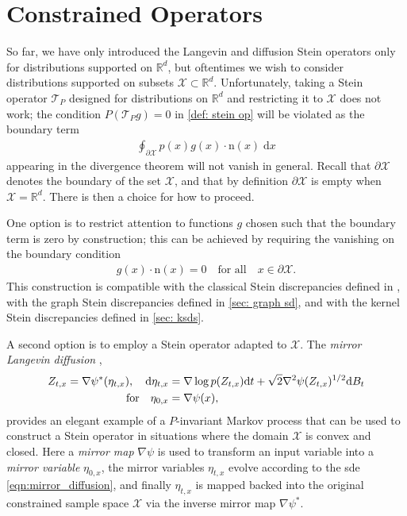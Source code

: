 \documentclass[12pt,paper=letter]{scrreprt}
\newcommand{\qtext}[1]{\quad\text{#1}\quad}
\def\reals{\mathbb{R}} %
\newcommand{\grad}{\nabla} %
\newcommand{\Hess}{\nabla^2} %
\newcommand{\xset}[0]{\mathcal{X}} %
\begin{document}
\section{Constrained Operators}
\label{sec: mirrored operators}

So far, we have only introduced the Langevin and diffusion Stein operators only for distributions supported on $\reals^d$, but oftentimes we wish to consider distributions supported on subsets $\xset \subset \reals^d$.
Unfortunately, taking a Stein operator $\mathcal{T}_P$ designed for distributions on $\mathbb{R}^d$ and restricting it to $\mathcal{X}$ does not work; the condition $P(\mathcal{T}_P g) = 0$ in \cref{def: stein op} will be violated as the boundary term 
\begin{align*}
    \oint_{\partial \mathcal{X}} p(x) g(x) \cdot \mathrm{n}(x) \; \mathrm{d}x
\end{align*}
appearing in the divergence theorem will not vanish in general.
Recall that $\partial\mathcal{X}$ denotes the boundary of the set $\mathcal{X}$, and that by definition $\partial \mathcal{X}$ is empty when $\mathcal{X} = \mathbb{R}^d$.
There is then a choice for how to proceed.

One option is to restrict attention to functions $g$ chosen such that the boundary term is zero by construction; this can be achieved by requiring the vanishing on the boundary condition \citep{gorham2015measuring}
\begin{align}\label{eq:vanishing-boundary-condition}
g(x) \cdot \mathrm{n}(x) = 0
\qtext{for all}
x \in \partial\mathcal{X}.
\end{align}
This construction is compatible with the classical Stein discrepancies defined in , with the graph Stein discrepancies defined in \cref{sec: graph sd}, and with the kernel Stein discrepancies defined in \cref{sec: ksds}.

A second option is to employ a Stein operator adapted to $\mathcal{X}$.
The \emph{mirror Langevin diffusion} \citep{zhang2020wasserstein,chewi2020exponential}, 
\begin{align}
Z_{t,x} = \grad \psi^*(\eta_{t,x}),
\quad
\mathrm{d}\eta_{t,x} &= \grad \log p(Z_{t,x}) \mathrm{d}t  + \sqrt{2} \Hess\psi(Z_{t,x})^{1/2} \mathrm{d}B_t \notag\\
\label{eqn:mirror_diffusion}
\qtext{for}
\eta_{0,x} &= \grad \psi(x), 
\end{align}
provides an elegant example of a $P$-invariant Markov process that can be used to construct a Stein operator in situations where the domain $\xset$ is convex and closed. 
Here a \emph{mirror map} $\grad \psi$ is used to transform an input variable into a \emph{mirror variable} $\eta_{0,x}$, 
the mirror variables $\eta_{t,x}$ evolve according to the \ac{sde} \cref{eqn:mirror_diffusion}, 
and finally $\eta_{t,x}$ is mapped backed into the original constrained sample space $\xset$ via the inverse mirror map $\grad \psi^*$.
\end{document}
